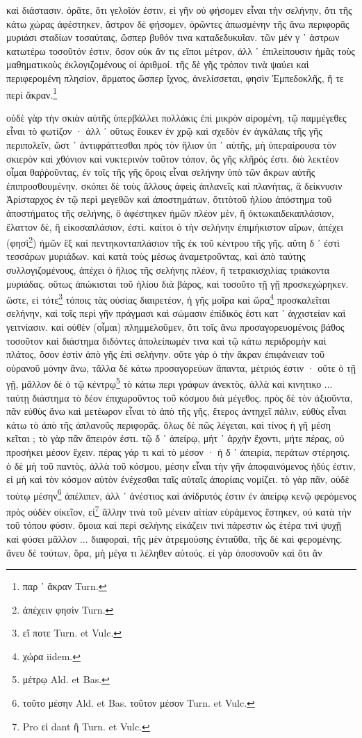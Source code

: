 \documentclass[a4paper, 11pt, oneside, polutonikogreek, german]{article}
\begin{document}
καὶ διάστασιν. ὁρᾶτε, ὅτι γελοῖόν ἐστιν, εἰ γῆν οὐ φήσομεν εἶναι τὴν σελήνην, ὅτι τῆς κάτω χώρας ἀφέστηκεν, ἄστρον δὲ φήσομεν, ὁρῶντες ἀπωσμένην τῆς ἄνω περιφορᾶς μυριάσι σταδίων τοσαύταις, ὥσπερ βυθόν τινα καταδεδυκυῖαν. τῶν μέν γ ᾽ ἀστρων κατωτέρω τοσοῦτόν ἐστιν, ὅσον οὐκ ἄν τις εἴποι μέτρον, ἀλλ ᾽ ἐπιλείπουσιν ἡμᾶς τοὺς μαθηματικοὺς ἐκλογιζομένους οἱ ἀριθμοί. τῆς δὲ γῆς τρόπον τινὰ ψαύει καὶ περιφερομένη πλησίον, ἅρματος ὥσπερ ἴχνος, ἀνελίσσεται, φησὶν Ἐμπεδοκλῆς, ἥ τε περὶ ἄκραν.\footnote{παρ ᾽ ἂκραν Turn.}

οὐδὲ γὰρ τὴν σκιὰν αὐτῆς ὑπερβάλλει πολλάκις ἐπὶ μικρὸν αἰρομένη, τῷ παμμέγεθες εἶναι τὸ φωτίζον · ἀλλ ᾽ οὕτως ἔοικεν ἐν χρῷ καὶ σχεδὸν ἐν ἀγκάλαις τῆς γῆς περιπολεῖν, ὥστ ᾽ ἀντιφράττεσθαι πρὸς τὸν ἥλιον ὑπ ᾽ αὐτῆς, μὴ ὑπεραίρουσα τὸν σκιερὸν καὶ χθόνιον καὶ νυκτερινὸν τοῦτον τόπον, ὃς γῆς κλῆρός ἐστι. διὸ λεκτέον οἶμαι θαῤῥοῦντας, ἐν τοῖς τῆς γῆς ὅροις εἶναι σελήνην ὑπὸ τῶν ἄκρων αὐτῆς ἐπιπροσθουμένην. σκόπει δὲ τοὺς ἄλλους ἀφεὶς ἀπλανεῖς καὶ πλανήτας, ἃ δείκνυσιν Ἀρίσταρχος ἐν τῷ περὶ μεγεθῶν καὶ ἀποστημάτων, ὅτιτὸτοῦ ἡλίου ἀπόστημα τοῦ ἀποστήματος τῆς σελήνης, ὃ ἀφέστηκεν ἡμῶν πλέον μὲν, ἢ ὀκτωκαιδεκαπλάσιον, ἔλαττον δὲ, ἢ εἰκοσαπλάσιον, ἐστί. καίτοι ὁ τὴν σελήνην ἐπιμήκιστον αἴρων, ἀπέχει (φησὶ\footnote{ἀπέχειν φησὶν Turn.}) ἡμῶν ἓξ καὶ πεντηκονταπλάσιον τῆς ἐκ τοῦ κέντρου τῆς γῆς. αὕτη δ ᾽ ἐστὶ τεσσάρων μυριάδων. καὶ κατὰ τοὺς μέσως ἀναμετροῦντας, καὶ ἀπὸ ταύτης συλλογιζομένους, ἀπέχει ὁ ἥλιος τῆς σελήνης πλέον, ἢ τετρακισχιλίας τριάκοντα μυριάδας. οὕτως ἀπώκισται τοῦ ἡλίου διὰ βάρος, καὶ τοσοῦτο τῇ γῇ προσκεχώρηκεν. ὥστε, εἰ τότε\footnote{εἴ ποτε Turn. et Vulc.} τόποις τὰς οὐσίας διαιρετέον, ἡ γῆς μοῖρα καὶ ὥρα\footnote{χώρα iidem.} προσκαλεῖται σελήνην, καὶ τοῖς περὶ γῆν πράγμασι καὶ σώμασιν ἐπίδικός ἐστι κατ ᾽ ἀγχιστείαν καὶ γειτνίασιν. καὶ οὐθὲν (οἶμαι) πλημμελοῦμεν, ὅτι τοῖς ἄνω προσαγορευομένοις βάθος τοσοῦτον καὶ διάστημα διδόντες ἀπολείπωμέν τινα καὶ τῷ κάτω περιδρομὴν καὶ πλάτος, ὅσον ἐστὶν ἀπὸ γῆς ἐπὶ σελήνην. οὔτε γὰρ ὁ τὴν ἄκραν ἐπιφάνειαν τοῦ οὐρανοῦ μόνην ἄνω, τἄλλα δὲ κάτω προσαγορεύων ἅπαντα, μέτριός ἐστιν · οὔτε ὁ τῇ γῇ, μᾶλλον δὲ ὁ τῷ κέντρῳ\footnote{μέτρῳ Ald. et Bas.} τὸ κάτω περι γράφων ἀνεκτὸς, ἀλλὰ καὶ κινητικο ... ταύτῃ διάστημα τὸ δέον ἐπιχωροῦντος τοῦ κόσμου διὰ μέγεθος. πρὸς δὲ τὸν ἀξιοῦντα, πᾶν εὐθὺς ἄνω καὶ μετέωρον εἶναι τὸ ἀπὸ τῆς γῆς, ἕτερος ἀντηχεῖ πάλιν, εὐθὺς εἶναι κάτω τὸ ἀπὸ τῆς ἀπλανοῦς περιφορᾶς. ὅλως δὲ πῶς λέγεται, καὶ τίνος ἡ γῆ μέση κεῖται ; τὸ γὰρ πᾶν ἄπειρόν ἐστι. τῷ δ ᾽ ἀπείρῳ, μήτ ᾽ ἀρχὴν ἔχοντι, μήτε πέρας, οὐ προσήκει μέσον ἔχειν. πέρας γάρ τι καὶ τὸ μέσον · ἡ δ ᾽ ἀπειρία, περάτων στέρησις. ὁ δὲ μὴ τοῦ παντὸς, ἀλλὰ τοῦ κόσμου, μέσην εἶναι τὴν γῆν ἀποφαινόμενος ἡδύς ἐστιν, εἰ μὴ καὶ τὸν κόσμον αὐτὸν ἐνέχεσθαι ταῖς αὐταῖς ἀπορίαις νομίζει. τὸ γὰρ πᾶν, οὐδὲ τούτῳ μέσην\footnote{τοῦτο μέσην Ald. et Bas. τοῦτον μέσον Turn. et Vulc.} ἀπέλιπεν, ἀλλ ᾽ ἀνέστιος καὶ ἀνίδρυτός ἐστιν ἐν ἀπείρῳ κενῷ φερόμενος πρὸς οὐδὲν οἰκεῖον, εἰ\footnote{Pro εἰ dant ἢ Turn. et Vulc.} ἄλλην τινὰ τοῦ μένειν αἰτίαν εὑράμενος ἕστηκεν, οὐ κατὰ τὴν τοῦ τόπου φύσιν. ὅμοια καὶ περὶ σελήνης εἰκάζειν τινὶ πάρεστιν ὡς ἑτέρα τινὶ ψυχῇ καὶ φύσει μᾶλλον ... διαφοραὶ, τῆς μὲν ἀτρεμούσης ἐνταῦθα, τῆς δὲ καὶ φερομένης. ἄνευ δὲ τούτων, ὅρα, μὴ μέγα τι λέληθεν αὐτούς. εἰ γὰρ ὁποσονοῦν καὶ ὅτι ἂν 
\end{document}
